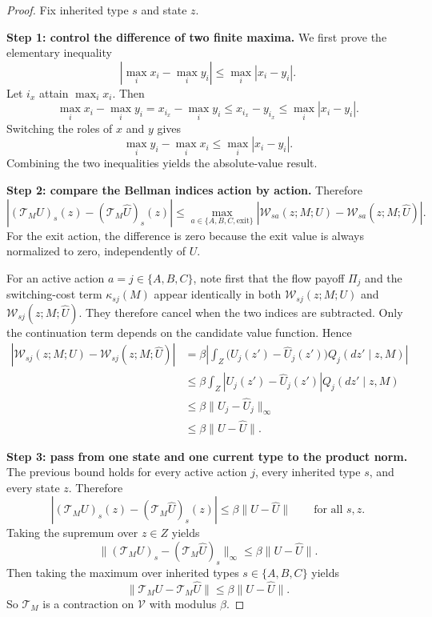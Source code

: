 \begin{proof}
Fix inherited type $s$ and state $z$.

\medskip\noindent\textbf{Step 1: control the difference of two finite maxima.}
We first prove the elementary inequality
\[
|\max_i x_i-\max_i y_i|\le\max_i|x_i-y_i|.
\]
Let $i_x$ attain $\max_i x_i$. Then
\[
\max_i x_i-\max_i y_i=x_{i_x}-\max_i y_i\le x_{i_x}-y_{i_x}\le \max_i|x_i-y_i|.
\]
Switching the roles of $x$ and $y$ gives
\[
\max_i y_i-\max_i x_i\le \max_i|x_i-y_i|.
\]
Combining the two inequalities yields the absolute-value result.

\medskip\noindent\textbf{Step 2: compare the Bellman indices action by action.}
Therefore
\[
|(\mathcal T_MU)_s(z)-(\mathcal T_M\widehat U)_s(z)|
\le\max_{a\in\{A,B,C,\mathrm{exit}\}}|\mathcal W_{sa}(z;M;U)-\mathcal W_{sa}(z;M;\widehat U)|.
\]
For the exit action, the difference is zero because the exit value is always normalized to zero, independently of $U$.

For an active action $a=j\in\{A,B,C\}$, note first that the flow payoff $\Pi_j$ and the switching-cost term $\kappa_{sj}(M)$ appear identically in both $\mathcal W_{sj}(z;M;U)$ and $\mathcal W_{sj}(z;M;\widehat U)$. They therefore cancel when the two indices are subtracted. Only the continuation term depends on the candidate value function. Hence
\begin{align*}
|\mathcal W_{sj}(z;M;U)-\mathcal W_{sj}(z;M;\widehat U)|
&=\beta\left|\int_Z \bigl(U_j(z')-\widehat U_j(z')\bigr)Q_j(dz'\mid z,M)\right|\\
&\le\beta\int_Z |U_j(z')-\widehat U_j(z')|Q_j(dz'\mid z,M)\\
&\le\beta\|U_j-\widehat U_j\|_\infty\\
&\le\beta\|U-\widehat U\|.
\end{align*}

\medskip\noindent\textbf{Step 3: pass from one state and one current type to the product norm.}
The previous bound holds for every active action $j$, every inherited type $s$, and every state $z$. Therefore
\[
|(\mathcal T_MU)_s(z)-(\mathcal T_M\widehat U)_s(z)|
\le
\beta\|U-\widehat U\|
\qquad\text{for all }s,z.
\]
Taking the supremum over $z\in Z$ yields
\[
\|(\mathcal T_MU)_s-(\mathcal T_M\widehat U)_s\|_\infty
\le
\beta\|U-\widehat U\|.
\]
Then taking the maximum over inherited types $s\in\{A,B,C\}$ yields
\[
\|\mathcal T_MU-\mathcal T_M\widehat U\|
\le
\beta\|U-\widehat U\|.
\]
So $\mathcal T_M$ is a contraction on $\mathcal V$ with modulus $\beta$.
\end{proof}


